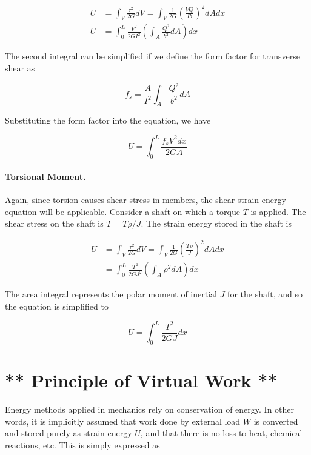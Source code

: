 \documentclass[
10pt,
a4paper,
openany,
svgnames,
]{kaobook} %
\begin{document}
\begin{align*}
  U &= \int_V \frac{\tau^2}{2G} dV = \int_V \frac{1}{2G} \left( \frac{VQ}{Ib} \right)^2 dA dx \\
  U &= \int_0^L \frac{V^2}{2GI^2} \left( \int_A \frac{Q^2}{b^2} dA \right) dx
\end{align*}

The second integral can be simplified if we define the form factor for transverse shear as

\begin{equation}
  f_s = \frac{A}{I^2} \int_A \frac{Q^2}{b^2} dA
\end{equation}

Substituting the form factor into the equation, we have

\begin{equation}
  U = \int_0^L \frac{f_s V^2 dx}{2GA}
\end{equation}

\paragraph{Torsional Moment.}

Again, since torsion causes shear stress in members, the shear strain energy equation will be applicable. Consider a shaft on which a torque $T$ is applied. The shear stress on the shaft is $T = T \rho / J$. The strain energy stored in the shaft is

\begin{align*}
  U &= \int_V \frac{\tau^2}{2G} dV = \int_V \frac{1}{2G} \left( \frac{T \rho}{J} \right)^2 dA dx \\
    &= \int_0^L \frac{T^2}{2GJ^2} \left( \int_A \rho^2 dA \right) dx
\end{align*}

The area integral represents the polar moment of inertial $J$ for the shaft, and so the equation is simplified to

\begin{equation}
  U = \int_0^L \frac{T^2}{2GJ} dx
\end{equation}

\section{** Principle of Virtual Work **}

Energy methods applied in mechanics rely on conservation of energy. In other words, it is implicitly assumed that work done by external load $W$ is converted and stored purely as strain energy $U$, and that there is no loss to heat, chemical reactions, etc. This is simply expressed as
\end{document}
